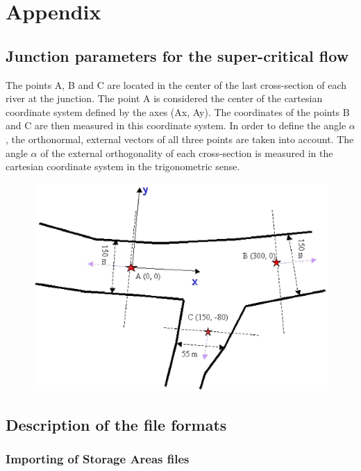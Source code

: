\documentclass[a4paper,12pt]{article}
\begin{document}
%
%
\section{Appendix}


\subsection{Junction parameters for the super-critical flow}

\label{jpsf}

\hspace{0.5cm}The points A, B and C are located in the center of the last cross-section
of each river at the junction. The point A is considered the center
of the cartesian coordinate system defined by the axes (Ax, Ay). The
coordinates of the points B and C are then measured in this coordinate
system. In order to define the angle $\alpha$, the orthonormal,
external vectors of all three points are taken into account. The angle
$\alpha$ of the external orthogonality of each cross-section is
measured in the cartesian coordinate system in the trigonometric sense.


\begin{figure}[h]
  \begin{center}
  \includegraphics[scale=0.7]{junctionA}
  \end{center}
\end{figure}

\subsection{Description of the file formats}
\subsubsection{Importing of Storage Areas files}
\end{document}

